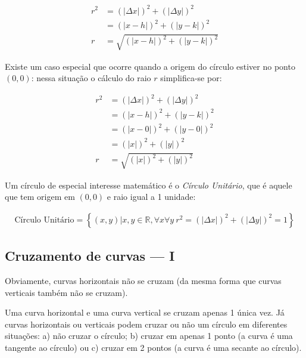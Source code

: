 \documentclass[pdftex, brazil, 12pt, twoside]{article}
\begin{document}
\begin{equation}
  \begin{split}
    r^2 & = (|\Delta x|)^2 + (|\Delta y|)^2\\
        & = (|x - h|)^2 + (|y - k|)^2\\
      r & = \sqrt{(|x - h|)^2 + (|y - k|)^2}
  \end{split}
\end{equation}

Existe um caso especial que ocorre quando a origem do círculo estiver no ponto $(0, 0)$: nessa
situação o cálculo do raio $r$ simplifica-se por:

\begin{equation}
  \begin{split}
    r^2 & = (|\Delta x|)^2 + (|\Delta y|)^2\\
        & = (|x - h|)^2 + (|y - k|)^2\\
        & = (|x - 0|)^2 + (|y - 0|)^2\\
        & = (|x|)^2 + (|y|)^2\\
      r & = \sqrt{(|x|)^2 + (|y|)^2}
  \end{split}
\end{equation}

Um círculo de especial interesse matemático é o \emph{Círculo Unitário}, que é aquele
que tem origem em $(0, 0)$ e raio igual a 1 unidade:

\begin{equation}
  \begin{split}
    \text{Círculo Unitário} = \left\{(x, y) | x,y \in \mathbb{R}, \forall x \forall y\ r^2 = (|\Delta x|)^2 + (|\Delta y|)^2 = 1\right\}
  \end{split}
\end{equation}


\subsection{Cruzamento de curvas --- I}
\label{tres-curvas-cruzamento-I}

Obviamente, curvas horizontais não se cruzam (da mesma forma que
curvas verticais também não se cruzam).

Uma curva horizontal e uma curva vertical se cruzam apenas 1 única vez.
Já curvas horizontais ou verticais podem cruzar ou não um círculo em diferentes
situações: a) não cruzar o círculo; b) cruzar em apenas 1 ponto (a curva é uma tangente
ao círculo) ou c) cruzar em 2 pontos (a curva é uma secante ao círculo).
\end{document}
